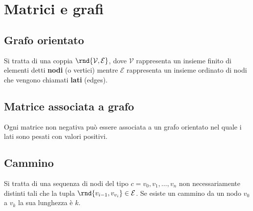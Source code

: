 \documentclass[\main/main.tex]{subfiles}
\begin{document}

\section{Matrici e grafi}
\subsection{Grafo orientato}
Si tratta di una coppia \(\rnd{\mathcal{V}, \mathcal{E}}\), dove \(\mathcal{V}\) rappresenta un insieme finito di elementi detti \textbf{nodi} (o vertici) mentre \(\mathcal{E}\) rappresenta un insieme ordinato di nodi che vengono chiamati \textbf{lati} (edges).

\subsection{Matrice associata a grafo}
Ogni matrice non negativa può essere associata a un grafo orientato nel quale i lati sono pesati con valori positivi.

\subsection{Cammino}
Si tratta di una sequenza di nodi del tipo \(c = {v_0, v_1, \ldots, v_n}\) non necessariamente distinti tali che la tupla \(\rnd{v_{i-1}, v_{v_i}} \in \mathcal{E}\). Se esiste un cammino da un nodo \(v_0\) a \(v_k\) la sua lunghezza è \(k\).
\end{document}
